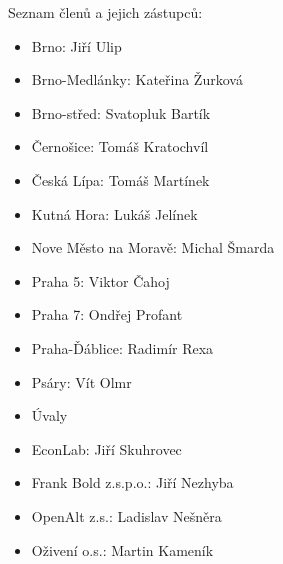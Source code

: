 \documentclass[a4paper,12pt]{letter}
\begin{document}
\begin{letter}{}{}
Seznam členů a jejich zástupců:
\begin{itemize}
\item Brno: Jiří Ulip
\item Brno-Medlánky: Kateřina Žurková
\item Brno-střed: Svatopluk Bartík
\item Černošice: Tomáš Kratochvíl
\item Česká Lípa: Tomáš Martínek
\item Kutná Hora: Lukáš Jelínek
\item Nove Město na Moravě: Michal Šmarda
\item Praha 5: Viktor Čahoj
\item Praha 7: Ondřej Profant
\item Praha-Ďáblice: Radimír Rexa
\item Psáry: Vít Olmr
\item Úvaly
\item EconLab: Jiří Skuhrovec
\item Frank Bold z.s.p.o.: Jiří Nezhyba
\item OpenAlt z.s.: Ladislav Nešněra
\item Oživení o.s.: Martin Kameník
\end{itemize}

\vspace{0.1\textwidth}
\begin{flushright}
\\
\\
\end{flushright}
\end{letter}
\end{document}
